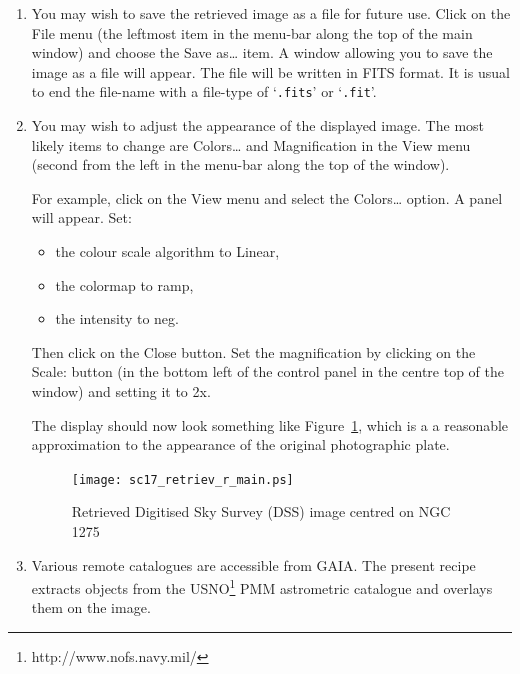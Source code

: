 \documentclass[twoside,11pt]{article}
\newcommand{\htmladdnormallinkfoot}[2]{#1\footnote{#2}}
\begin{document}
\begin{enumerate}
  \item You may wish to save the retrieved image as a file for future
   use.  Click on the {\sf File} menu (the leftmost item in the menu-bar
   along the top of the main window) and choose the {\sf Save as\ldots}
   item.  A window allowing you to save the image as a file will appear.
   The file will be written in FITS format.  It is usual to end the
   file-name with a file-type of `{\tt .fits}' or `{\tt .fit}'.

  \item You may wish to adjust the appearance of the displayed image.
   The most likely items to change are {\sf Colors\ldots} and {\sf
   Magnification} in the {\sf View} menu (second from the left in the
   menu-bar along the top of the window).

   For example, click on the {\sf View} menu and select the {\sf
   Colors\ldots} option.  A panel will appear.  Set:

  \begin{itemize}

    \item the colour scale algorithm to {\sf Linear},

    \item the colormap to {\sf ramp},

    \item the intensity to {\sf neg}.

  \end{itemize}

   Then click on the {\sf Close} button.
   Set the magnification by clicking on the {\sf Scale:} button (in the
   bottom left of the control panel in the centre top of the window) and
   setting it to {\sf 2x}.

   The display should now look something like Figure~\ref{RETRIEV_R_MAIN},
   which is a a reasonable approximation to the appearance of the
   original photographic plate.

  \begin{figure}[htbp]
     \centering
     \texttt{[image: sc17\_retriev\_r\_main.ps]}
     \begin{quote}
     \caption[Retrieved DSS image centred on NGC 1275]
     {Retrieved Digitised Sky Survey (DSS) image centred on NGC 1275
     \label{RETRIEV_R_MAIN} }
     \end{quote}
  \end{figure}

  \item Various remote catalogues are accessible from GAIA.  The present
   recipe extracts objects from the 
   \htmladdnormallinkfoot{USNO}{http://www.nofs.navy.mil/} PMM astrometric
   catalogue\cite{PMM} and overlays them on the image.


\end{enumerate}
\end{document}
